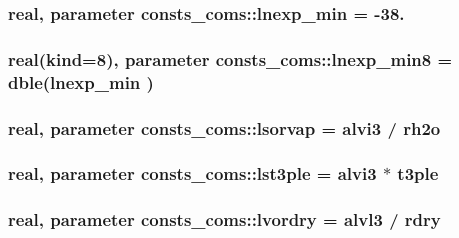 \subsubsection[{\texorpdfstring{lnexp\+\_\+min}{lnexp_min}}]{\setlength{\rightskip}{0pt plus 5cm}real, parameter consts\+\_\+coms\+::lnexp\+\_\+min = -\/38.}\hypertarget{namespaceconsts__coms_a7593d016f6b5a649ea21585de53834f0}{}\label{namespaceconsts__coms_a7593d016f6b5a649ea21585de53834f0}
\subsubsection[{\texorpdfstring{lnexp\+\_\+min8}{lnexp_min8}}]{\setlength{\rightskip}{0pt plus 5cm}real(kind=8), parameter consts\+\_\+coms\+::lnexp\+\_\+min8 = dble({\bf lnexp\+\_\+min} )}\hypertarget{namespaceconsts__coms_a88b6625340c134995d6ce2ae8ad8f7b4}{}\label{namespaceconsts__coms_a88b6625340c134995d6ce2ae8ad8f7b4}
\subsubsection[{\texorpdfstring{lsorvap}{lsorvap}}]{\setlength{\rightskip}{0pt plus 5cm}real, parameter consts\+\_\+coms\+::lsorvap = {\bf alvi3} / {\bf rh2o}}\hypertarget{namespaceconsts__coms_acc7a981d4dc90ba43c3f6fe6188ebc22}{}\label{namespaceconsts__coms_acc7a981d4dc90ba43c3f6fe6188ebc22}
\subsubsection[{\texorpdfstring{lst3ple}{lst3ple}}]{\setlength{\rightskip}{0pt plus 5cm}real, parameter consts\+\_\+coms\+::lst3ple = {\bf alvi3} $\ast$ {\bf t3ple}}\hypertarget{namespaceconsts__coms_a24b93259012881571e8873572d0e6a93}{}\label{namespaceconsts__coms_a24b93259012881571e8873572d0e6a93}
\subsubsection[{\texorpdfstring{lvordry}{lvordry}}]{\setlength{\rightskip}{0pt plus 5cm}real, parameter consts\+\_\+coms\+::lvordry = {\bf alvl3} / {\bf rdry}}\hypertarget{namespaceconsts__coms_ae611b04973a1008f366e8060a2a88777}{}\label{namespaceconsts__coms_ae611b04973a1008f366e8060a2a88777}
